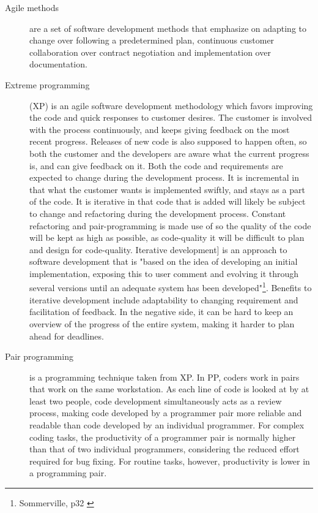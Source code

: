 \begin{description}

\item[Agile methods] \label{def:agile} are a set of software development methods that emphasize on adapting to change over following a predetermined plan, continuous customer collaboration over contract negotiation and implementation over documentation.

\item[Extreme programming] (XP) is an agile software development methodology which favors improving the code and quick responses to customer desires. The customer is involved with the process continuously, and keeps giving feedback on the most recent progress. Releases of new code is also supposed to happen often, so both the customer and the developers are aware what the current progress is, and can give feedback on it. Both the code and requirements are expected to change during the development process. It is incremental in that what the customer wants is implemented swiftly, and stays as a part of the code. It is iterative in that code that is added will likely be subject to change and refactoring during the development process. Constant refactoring and pair-programming is made use of so the quality of the code will be kept as high as possible, as code-quality it will be difficult to plan and design for code-quality. 
Iterative development] \label{def:incrementalDev} is an approach to software development that is "based on the idea of developing an initial implementation, exposing this to user comment and evolving it through several versions until an adequate system has been developed"\footnote{Sommerville, p32 \cite{sommerville}}. Benefits to iterative development include adaptability to changing requirement and facilitation of feedback. In the negative side, it can be hard to keep an overview of the progress of the entire system, making it harder to plan ahead for deadlines.

\item[Pair programming] \label{def:pairprogram} is a programming technique taken from XP. In PP, coders work in pairs that work on the same workstation. As each line of code is looked at by at least two people, code development simultaneously acts as a review process, making code developed by a programmer pair more reliable and readable than code developed by an individual programmer. For complex coding tasks, the productivity of a programmer pair is normally higher than that of two individual programmers, considering the reduced effort required for bug fixing. For routine tasks, however, productivity is lower in a programming pair.


\end{description}
